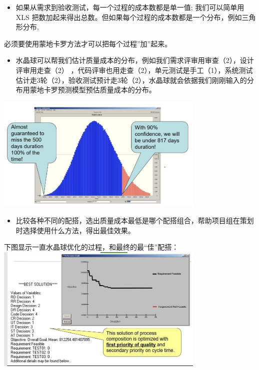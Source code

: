 \begin{itemize}
\tightlist
\item
  如果从需求到验收测试，每一个过程的成本数都是单一值; 我们可以简单用 XLS
  把数加起来得出总数。但如果每个过程的成本数都是一个分布，例如三角形分布,
\end{itemize}

必须要使用蒙地卡罗方法才可以把每个过程''加''起来。

\begin{itemize}
\tightlist
\item
  水晶球可以帮我们估计质量成本的分布，例如我们需求评审用审查（2），设计评审用走查（2）
  ，代码评审也用走查（2），单元测试是手工（1），系统测试估计走3轮（2），验收测试预计走3轮（2），水晶球就会依据我们刚刚输入的分布用蒙地卡罗预测模型预估质量成本的分布。
\end{itemize}


\includegraphics[width=10cm]{HmttDistScreenshot_2021-10-08_165836.jpg}

\begin{itemize}
\tightlist
\item
  比较各种不同的配搭，选出质量成本最低是哪个配搭组合，帮助项目组在策划时选择使用什么方法，得出最佳效果。
\end{itemize}

下图显示一直水晶球优化的过程，和最终的最``佳''配搭：\\


\includegraphics[width=10cm]{HmttOptScreenshot_2021-10-08_165653.jpg}

